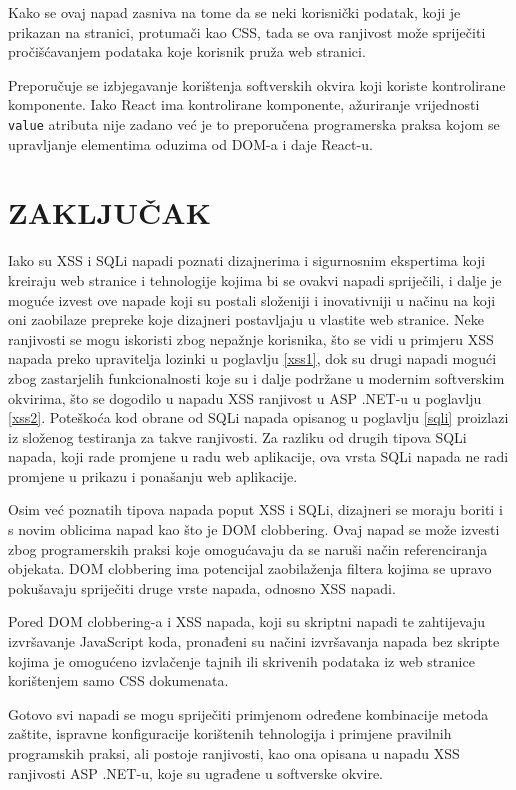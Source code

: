 \documentclass[12pt, oneside, onecolumn]{book}
\begin{document}
{Kako se ovaj napad zasniva na tome da se neki korisnički podatak, koji je prikazan na stranici, protumači kao CSS, tada se ova ranjivost može spriječiti pročišćavanjem podataka koje korisnik pruža web stranici.

Preporučuje se izbjegavanje korištenja softverskih okvira koji koriste kontrolirane komponente. Iako React ima kontrolirane komponente, ažuriranje vrijednosti \texttt{value} atributa nije zadano već je to preporučena programerska praksa kojom se upravljanje elementima oduzima od DOM-a i daje React-u.

\chapter{ZAKLJUČAK}
Iako su XSS i SQLi napadi poznati dizajnerima i sigurnosnim ekspertima koji kreiraju web stranice i tehnologije kojima bi se ovakvi napadi spriječili, i dalje je moguće izvest ove napade koji su postali složeniji i inovativniji u načinu na koji oni zaobilaze prepreke koje dizajneri postavljaju u vlastite web stranice. Neke ranjivosti se mogu iskoristi zbog nepažnje korisnika, što se vidi u primjeru XSS napada preko upravitelja lozinki u poglavlju \ref{xss1}, dok su drugi napadi mogući zbog zastarjelih funkcionalnosti koje su i dalje podržane u modernim softverskim okvirima, što se dogodilo u napadu XSS ranjivost u ASP .NET-u u poglavlju \ref{xss2}. Poteškoća kod obrane od SQLi napada opisanog u poglavlju \ref{sqli} proizlazi iz složenog testiranja za takve ranjivosti. Za razliku od drugih tipova SQLi napada, koji rade promjene u radu web aplikacije, ova vrsta SQLi napada ne radi promjene u prikazu i ponašanju web aplikacije.

Osim već poznatih tipova napada poput XSS i SQLi, dizajneri se moraju boriti i s novim oblicima napad kao što je DOM clobbering. Ovaj napad se može izvesti zbog programerskih praksi koje omogućavaju da se naruši način referenciranja objekata. DOM clobbering ima potencijal zaobilaženja filtera kojima se upravo pokušavaju spriječiti druge vrste napada, odnosno XSS napadi.

Pored DOM clobbering-a i XSS napada, koji su skriptni napadi te zahtijevaju izvršavanje JavaScript koda, pronađeni su načini izvršavanja napada bez skripte kojima je omogućeno izvlačenje tajnih ili skrivenih podataka iz web stranice korištenjem samo CSS dokumenata.

Gotovo svi napadi se mogu spriječiti primjenom određene kombinacije metoda zaštite, ispravne konfiguracije korištenih tehnologija i primjene pravilnih programskih praksi, ali postoje ranjivosti, kao ona opisana u napadu XSS ranjivosti ASP .NET-u, koje su ugrađene u softverske okvire.

}
\end{document}
